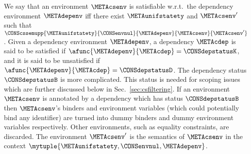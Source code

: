 \documentclass{jfp1}
\begin{document}


We say that an environment $\METAcsenv$ is satisfiable
w.r.t.\ the dependency environment $\METAdepenv$ iff there exist
$\METAunifstatety$ and $\METAcsenv'$ such that
$\CONScssemupp
{\METAunifstatety}
{\CONSenvnul}
{\METAdepenv}
{\METAcsenv}
{\METAcsenv'}$.
%
Given a dependency environment $\METAdepenv$, a dependency $\METAcdep$
is said to be satisfied if
$\afunc{\METAdepenv}{\METAcdep}=\CONSdepstatusK$, and it is said to be
unsatisfied if $\afunc{\METAdepenv}{\METAcdep}=\CONSdepstatusD$.  The
dependency status $\CONSdepstatusB$ is more complicated.  This status
is needed for scoping issues which are further discussed below in
Sec.~\ref{sec:csfiltering}.  If an environment $\METAcsenv$ is
annotated by a dependency which has status $\CONSdepstatusB$ then
$\METAcsenv$'s binders and environment variables (which could
potentially bind any identifier) are turned into dummy binders and
dummy environment variables respectively.  Other environments, such as
equality constraints,
are discarded.
%
The environment $\METAcsenv'$ is the semantics of
$\METAcsenv$ in the context
$\mytuple{\METAunifstatety,\CONSenvnul,\METAdepenv}$.

\end{document}
